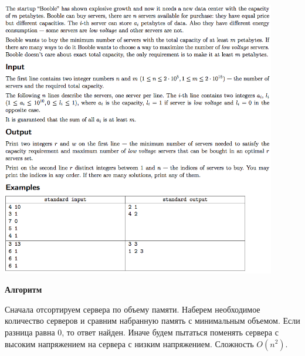 \documentclass[a4paper,12pt]{article}
\begin{document}
\begin{center}
\includegraphics[width=0.9\textwidth]{CT_ACM_WEST/CT_ACM_WEST_D.png}\\ [1cm]
\end{center}

\textbf{{\large Алгоритм}}

Сначала отсортируем сервера по объему памяти. Наберем необходимое количество серверов и сравним набранную память с минимальным объемом. Если разница равна $0$, то ответ найден. Иначе будем пытаться поменять сервера с высоким напряжением на сервера с низким напряжением. Сложность $O(n^2)$.
\end{document}
